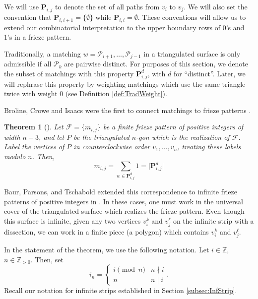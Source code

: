 \documentclass[12pt]{article}
\newtheorem{theorem}{Theorem}
\theoremstyle{remark}
\newcommand*{\pathset}[2]{\mathbf{P}_{#1,#2}}
\newcommand*{\poly}[1]{\mathcal{P}_{#1}}
\newcommand*{\F}{\mathcal{F}}
\newcommand*{\Z}{\mathbb{Z}}
\begin{document}
We will use $\pathset{i}{j}$ to denote the set of all paths from $v_i$ to $v_j$. We will also set the convention that $\pathset{i}{i+1} = \{ \emptyset\}$ while $\pathset{i}{i} = \emptyset$. These conventions will allow us to extend our combinatorial interpretation to the upper boundary rows of 0's and 1's in a frieze pattern.

Traditionally, a matching $w = \poly{i+1},\ldots,\poly{j-1}$ in a triangulated surface is only admissible if all $\poly{k}$ are pairwise distinct. For purposes of this section, we denote the subset of matchings with this property $\pathset{i}{j}^d$, with $d$ for ``distinct''. Later, we will rephrase this property by weighting matchings which use the same triangle twice with weight 0 (see Definition \ref{def:TradWeight}). 

Broline, Crowe and Isaacs were the first to connect matchings to frieze patterns \cite{5}.



\begin{theorem}[\cite{5}]\label{thm:BCI}
Let $\F = \{m_{i,j}\}$ be a finite frieze pattern of positive integers of width $n-3$, and let $P$ be the triangulated $n$-gon which is the realization of $\F$. Label the vertices of $P$ in counterclockwise order $v_1,\ldots,v_n$, treating these labels modulo $n$. Then, \[
m_{i,j} = \sum_{w \in \pathset{i}{j}^d} 1 = \vert  \pathset{i}{j}^d\vert
\]

\end{theorem}


 Baur, Parsons, and Tschabold extended this correspondence to infinite frieze patterns of positive integers in \cite{1}. In these cases, one must work in the universal cover of the triangulated surface which realizes the frieze pattern. Even though this surface is infinite, given any two vertices $v_i^{k}$ and $v_j^\ell$ on the infinite strip with a dissection, we can work in a finite piece (a polygon) which contains $v_i^k$ and $v_j^\ell$.
 
 
 In the statement of the theorem, we use the following notation. Let $i \in \mathbb{Z}$, $n \in \mathbb{Z}_{>0}$. Then, set \[
 i_n = \begin{cases} i \pmod{n} & n \nmid i \\
 n & n \mid i \end{cases}.
 \]
 Recall our notation for infinite strips established in Section \ref{subsec:InfStrip}. 
\end{document}
